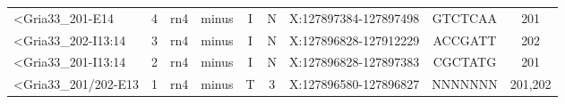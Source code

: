 \begin{table}[h]
\begin{tabular}{lcccccccc}
<Gria33\_201-E14                                                                   & 4         & rn4 & minus  & I                    & N                       & X:127897384-127897498 & GTCTCAA         & 201               \\
<Gria33\_202-I13:14                                                                & 3         & rn4 & minus  & I                    & N                       & X:127896828-127912229 & ACCGATT         & 202               \\
<Gria33\_201-I13:14                                                                & 2         & rn4 & minus  & I                    & N                       & X:127896828-127897383 & CGCTATG         & 201               \\
<Gria33\_201/202-E13                                                               & 1         & rn4 & minus  & T                    & 3                       & X:127896580-127896827 & NNNNNNN         & 201,202          
\end{tabular}
\end{table}